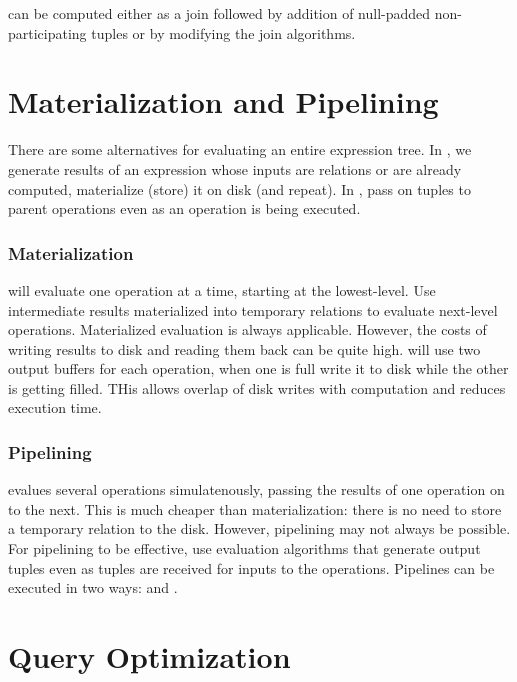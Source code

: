 \documentclass{article}
\begin{document}
 can be computed either as a join followed by addition of null-padded non-participating tuples or by modifying the join algorithms. \\ 

\section{Materialization and Pipelining}

There are some alternatives for evaluating an entire expression tree. In , we generate results of an expression whose inputs are relations or are already computed, materialize (store) it on disk (and repeat). In , pass on tuples to parent operations even as an operation is being executed. \\ 

\subsubsection{Materialization}

 will evaluate one operation at a time, starting at the lowest-level. Use intermediate results materialized into temporary relations to evaluate next-level operations. Materialized evaluation is always applicable. However, the costs of writing results to disk and reading them back can be quite high.  will use two output buffers for each operation, when one is full write it to disk while the other is getting filled. THis allows overlap of disk writes with computation and reduces execution time.

\subsubsection{Pipelining}

 evalues several operations simulatenously, passing the results of one operation on to the next. This is much cheaper than materialization: there is no need to store a temporary relation to the disk. However, pipelining may not always be possible. For pipelining to be effective, use evaluation algorithms that generate output tuples even as tuples are received for inputs to the operations. Pipelines can be executed in two ways:  and . 

\section{Query Optimization}
\end{document}
